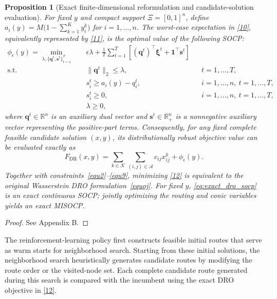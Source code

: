 \documentclass[preprint,12pt,authoryear]{elsarticle}
\newtheorem{proposition}{Proposition}
\theoremstyle{definition}
\begin{document}
{
\begin{proposition}[Exact finite-dimensional reformulation and candidate-solution evaluation]\label{prop:exact_reformulation}
For fixed $y$ and compact support $\Xi=[0,1]^n$, define
$a_i(y)=M\bigl(1-\sum_{k=1}^{K}y_i^k\bigr)$ for $i=1,\ldots,n$.
The worst-case expectation in \eqref{10}, equivalently represented by \eqref{11}, is the optimal value of the following SOCP:
\begin{equation}
\begin{aligned}
\phi_{\epsilon}(y)=
\min_{\lambda,\{\boldsymbol{q}^{t},\boldsymbol{s}^{t}\}_{t=1}^{T}}\quad
&\epsilon\lambda+
\frac{1}{T}\sum_{t=1}^{T}
\left[(\boldsymbol{q}^{t})^\top\boldsymbol{\xi}^t+
\boldsymbol{1}^\top\boldsymbol{s}^{t}\right]\\
\text{s.t.}\quad
&\|\boldsymbol{q}^{t}\|_2\leq\lambda,
&&t=1,\ldots,T,\\
&s_i^t\geq a_i(y)-q_i^t,
&&i=1,\ldots,n,\ t=1,\ldots,T,\\
&s_i^t\geq0,
&&i=1,\ldots,n,\ t=1,\ldots,T,\\
&\lambda\geq0,
\end{aligned}
\label{eq:exact_dro_socp}
\end{equation}
where $\boldsymbol{q}^{t}\in\mathbb{R}^{n}$ is an auxiliary dual vector and $\boldsymbol{s}^{t}\in\mathbb{R}_{+}^{n}$ is a nonnegative auxiliary vector representing the positive-part terms. Consequently, for any fixed complete feasible candidate solution $(x,y)$, its distributionally robust objective value can be evaluated exactly as
\begin{equation}
F_{\mathrm{DR}}(x,y)=
\sum_{k\in\mathcal{K}}\sum_{(i,j)\in\mathcal{A}}c_{ij}x_{ij}^k
+\phi_{\epsilon}(y).
\label{12}
\end{equation}
Together with constraints~\eqref{equ2}--\eqref{equ9}, minimizing \eqref{12} is equivalent to the original Wasserstein DRO formulation~\eqref{equoj}. For fixed $y$, \eqref{eq:exact_dro_socp} is an exact continuous SOCP; jointly optimizing the routing and conic variables yields an exact MISOCP.
\end{proposition}
\begin{proof}
See Appendix B.
\end{proof}

The reinforcement-learning policy first constructs feasible initial routes that serve as warm starts for neighborhood search. Starting from these initial solutions, the neighborhood search heuristically generates candidate routes by modifying the route order or the visited-node set. Each complete candidate route generated during this search is compared with the incumbent using the exact DRO objective in \eqref{12}.
}
\end{document}

